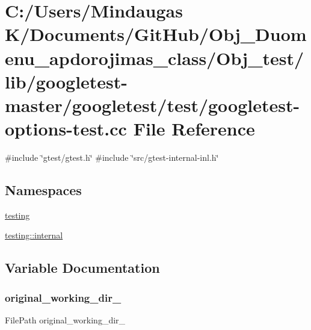 \hypertarget{_obj__test_2lib_2googletest-master_2googletest_2test_2googletest-options-test_8cc}{}\section{C\+:/\+Users/\+Mindaugas K/\+Documents/\+Git\+Hub/\+Obj\+\_\+\+Duomenu\+\_\+apdorojimas\+\_\+class/\+Obj\+\_\+test/lib/googletest-\/master/googletest/test/googletest-\/options-\/test.cc File Reference}
\label{_obj__test_2lib_2googletest-master_2googletest_2test_2googletest-options-test_8cc}
{\ttfamily \#include \char`\"{}gtest/gtest.\+h\char`\"{}}\newline
{\ttfamily \#include \char`\"{}src/gtest-\/internal-\/inl.\+h\char`\"{}}\newline
\subsection*{Namespaces}
\begin{DoxyCompactItemize}
\item 
 \mbox{\hyperlink{namespacetesting}{testing}}
\item 
 \mbox{\hyperlink{namespacetesting_1_1internal}{testing\+::internal}}
\end{DoxyCompactItemize}


\subsection{Variable Documentation}
\mbox{\label{_obj__test_2lib_2googletest-master_2googletest_2test_2googletest-options-test_8cc_aa5f13fd18a275d0a3117700f30bfb9ff}} 
\subsubsection{\texorpdfstring{original\_working\_dir\_}{original\_working\_dir\_}}
{\footnotesize\ttfamily File\+Path original\+\_\+working\+\_\+dir\+\_\+\hspace{0.3cm}{\ttfamily [protected]}}

